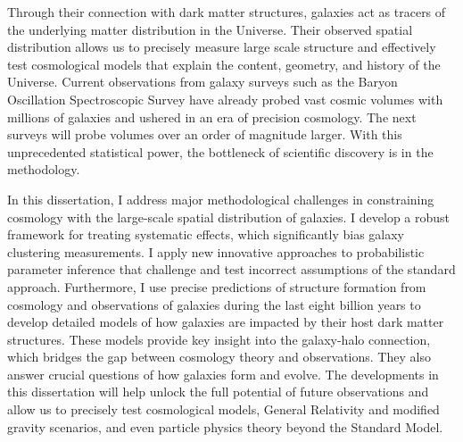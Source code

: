 Through their connection with dark matter structures, galaxies act as 
tracers of the underlying matter distribution in the Universe. Their 
observed spatial distribution allows us to precisely measure large scale 
structure and effectively test cosmological models that explain the content, 
geometry, and history of the Universe. Current observations from galaxy 
surveys such as the Baryon Oscillation Spectroscopic Survey
have already probed vast cosmic volumes with millions of galaxies 
and ushered in an era of precision cosmology. The next surveys will 
probe volumes over an order of magnitude larger. With this unprecedented 
statistical power, the bottleneck of scientific discovery is in the methodology.

In this dissertation, I address major methodological challenges in
constraining cosmology with the large-scale spatial distribution of 
galaxies. I develop a robust framework for treating systematic effects, 
which significantly bias galaxy clustering measurements. I apply new 
innovative approaches to probabilistic parameter inference that 
challenge and test incorrect assumptions of the standard approach. 
Furthermore, I use precise predictions of structure formation from
cosmology and observations of galaxies during the last eight billion 
years to develop detailed models of how galaxies are impacted by 
their host dark matter structures. These models provide key 
insight into the galaxy-halo connection, which bridges the gap
between cosmology theory and observations. They also answer crucial 
questions of how galaxies form and evolve. 
The developments in this dissertation will help unlock the full 
potential of future observations and allow us to precisely test 
cosmological models, General Relativity and modified gravity
scenarios, and even particle physics theory beyond the Standard 
Model.  
